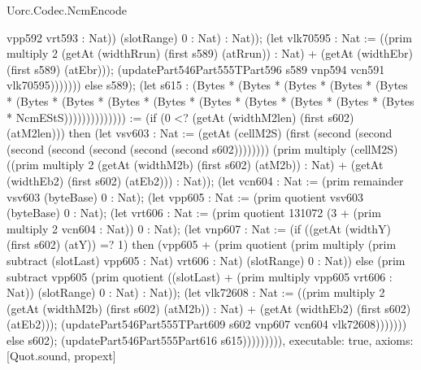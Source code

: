 \begin{lexlean}{Uorc.Codec.NcmEncode}
\begin{semanticmodule}
{vpp592 vrt593 : Nat)) (slotRange) 0 : Nat) : Nat)); (let vlk70595 : Nat := ((prim multiply 2 (getAt (widthRrun) (first s589) (atRrun)) : Nat) + (getAt (widthEbr) (first s589) (atEbr))); (updatePart546Part555TPart596 s589 vnp594 vcn591 vlk70595))))))) else s589); (let s615 : (Bytes * (Bytes * (Bytes * (Bytes * (Bytes * (Bytes * (Bytes * (Bytes * (Bytes * (Bytes * (Bytes * (Bytes * (Bytes * (Bytes * NcmEStS)))))))))))))) := (if (0 <? (getAt (widthM2len) (first s602) (atM2len))) then (let vsv603 : Nat := (getAt (cellM2S) (first (second (second (second (second (second (second (second s602)))))))) (prim multiply (cellM2S) ((prim multiply 2 (getAt (widthM2b) (first s602) (atM2b)) : Nat) + (getAt (widthEb2) (first s602) (atEb2))) : Nat)); (let vcn604 : Nat := (prim remainder vsv603 (byteBase) 0 : Nat); (let vpp605 : Nat := (prim quotient vsv603 (byteBase) 0 : Nat); (let vrt606 : Nat := (prim quotient 131072 (3 + (prim multiply 2 vcn604 : Nat)) 0 : Nat); (let vnp607 : Nat := (if ((getAt (widthY) (first s602) (atY)) =? 1) then (vpp605 + (prim quotient (prim multiply (prim subtract (slotLast) vpp605 : Nat) vrt606 : Nat) (slotRange) 0 : Nat)) else (prim subtract vpp605 (prim quotient ((slotLast) + (prim multiply vpp605 vrt606 : Nat)) (slotRange) 0 : Nat) : Nat)); (let vlk72608 : Nat := ((prim multiply 2 (getAt (widthM2b) (first s602) (atM2b)) : Nat) + (getAt (widthEb2) (first s602) (atEb2))); (updatePart546Part555TPart609 s602 vnp607 vcn604 vlk72608))))))) else s602); (updatePart546Part555Part616 s615))))))))),
  executable: true,
  axioms: [Quot.sound, propext]
}


\end{semanticmodule}
\end{lexlean}
